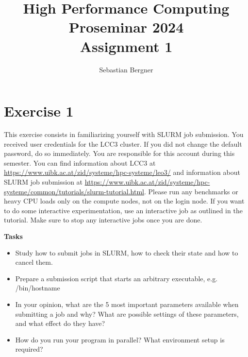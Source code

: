 \documentclass[UTF-8]{article}
\title{High Performance Computing Proseminar 2024 \\
    \large Assignment 1} %
\author{Sebastian Bergner}
\begin{document}
    
    \maketitle
    
    \section*{Exercise 1}
    This exercise consists in familiarizing yourself with SLURM job submission. 
    You received user credentials for the LCC3 cluster. If you did not change the default password, do so immediately. You are responsible for this
    account during this semester. 
    You can find information about LCC3 at \url{https://www.uibk.ac.at/zid/systeme/hpc-systeme/leo3/} and information about SLURM job submission at
    \url{https://www.uibk.ac.at/zid/systeme/hpc-systeme/common/tutorials/slurm-tutorial.html}. 
    Please run any benchmarks or heavy CPU loads only on the compute nodes, not on the login node. If you want to do some interactive
    experimentation, use an interactive job as outlined in the tutorial. Make sure to stop any interactive jobs once you are done. 
    
    \textbf{Tasks }
    \begin{itemize}
	    \item Study how to submit jobs in SLURM, how to check their state and how to cancel them.
	    \item Prepare a submission script that starts an arbitrary executable, e.g. /bin/hostname
	    \item In your opinion, what are the 5 most important parameters available when submitting a job and why? What are possible settings of these
	    parameters, and what effect do they have?
	    \item How do you run your program in parallel? What environment setup is required? 
	\end{itemize}	
	
\end{document}
